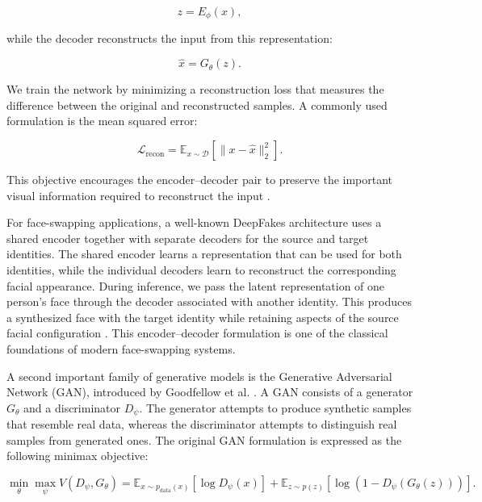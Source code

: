 \documentclass[a4paper,12pt]{article}
\begin{document}
\begin{equation}
z = E_{\phi}(x),
\label{eq:encoder}
\end{equation}

while the decoder reconstructs the input from this representation:

\begin{equation}
\hat{x} = G_{\theta}(z).
\label{eq:decoder}
\end{equation}

We train the network by minimizing a reconstruction loss that measures the difference between the original and reconstructed samples. A commonly used formulation is the mean squared error:

\begin{equation}
\mathcal{L}_{\mathrm{recon}} = \mathbb{E}_{x\sim\mathcal{D}} \left[ \lVert x-\hat{x}\rVert_2^2 \right].
\label{eq:recon-loss}
\end{equation}

This objective encourages the encoder--decoder pair to preserve the important visual information required to reconstruct the input \cite{hinton2006reducing}.

For face-swapping applications, a well-known DeepFakes architecture uses a shared encoder together with separate decoders for the source and target identities. The shared encoder learns a representation that can be used for both identities, while the individual decoders learn to reconstruct the corresponding facial appearance. During inference, we pass the latent representation of one person's face through the decoder associated with another identity. This produces a synthesized face with the target identity while retaining aspects of the source facial configuration \cite{rossler2019faceforensics,perov2020deepfacelab,li2020}. This encoder--decoder formulation is one of the classical foundations of modern face-swapping systems.

A second important family of generative models is the Generative Adversarial Network (GAN), introduced by Goodfellow et al. \cite{goodfellow2014generative}. A GAN consists of a generator $G_{\theta}$ and a discriminator $D_{\psi}$. The generator attempts to produce synthetic samples that resemble real data, whereas the discriminator attempts to distinguish real samples from generated ones. The original GAN formulation is expressed as the following minimax objective:

\begin{equation}
\min_{\theta}\max_{\psi} V(D_{\psi},G_{\theta}) = \mathbb{E}_{x\sim p_{\mathrm{data}}(x)} [\log D_{\psi}(x)] + \mathbb{E}_{z\sim p(z)} \left[ \log\left(1-D_{\psi}(G_{\theta}(z))\right) \right].
\label{eq:gan-loss}
\end{equation}
\end{document}
